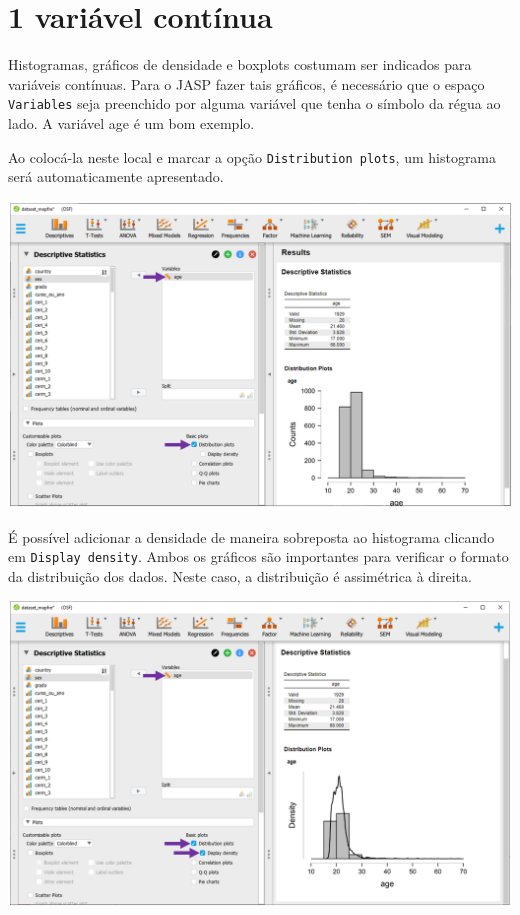 \documentclass[
]{book}
\begin{document}
\hypertarget{variuxe1vel-contuxednua-1}{%
\section{1 variável contínua}\label{variuxe1vel-contuxednua-1}}

Histogramas, gráficos de densidade e boxplots costumam ser indicados para variáveis contínuas. Para o JASP fazer tais gráficos, é necessário que o espaço \texttt{Variables} seja preenchido por alguma variável que tenha o símbolo da régua ao lado. A variável age é um bom exemplo.

Ao colocá-la neste local e marcar a opção \texttt{Distribution\ plots}, um histograma será automaticamente apresentado.

\includegraphics{./img/cap_desc_jasp_grafico_histograma.png}

É possível adicionar a densidade de maneira sobreposta ao histograma clicando em \texttt{Display\ density}. Ambos os gráficos são importantes para verificar o formato da distribuição dos dados. Neste caso, a distribuição é assimétrica à direita.

\includegraphics{./img/cap_desc_jasp_grafico_densidade.png}
\end{document}
